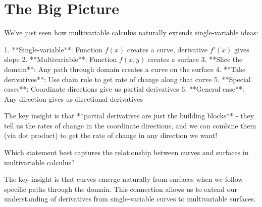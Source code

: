 \documentclass{ximera}
\begin{document}
\section{The Big Picture}

We've just seen how multivariable calculus naturally extends single-variable ideas:

1. **Single-variable**: Function $f(x)$ creates a curve, derivative $f'(x)$ gives slope
2. **Multivariable**: Function $f(x,y)$ creates a surface
3. **Slice the domain**: Any path through domain creates a curve on the surface  
4. **Take derivatives**: Use chain rule to get rate of change along that curve
5. **Special cases**: Coordinate directions give us partial derivatives
6. **General case**: Any direction gives us directional derivatives

The key insight is that **partial derivatives are just the building blocks** - they tell us the rates of change in the coordinate directions, and we can combine them (via dot product) to get the rate of change in any direction we want!

\begin{exercise}
Which statement best captures the relationship between curves and surfaces in multivariable calculus?

\begin{multipleChoice}
\end{multipleChoice}

\begin{feedback}
The key insight is that curves emerge naturally from surfaces when we follow specific paths through the domain. This connection allows us to extend our understanding of derivatives from single-variable curves to multivariable surfaces.
\end{feedback}
\end{exercise}
\end{document}

